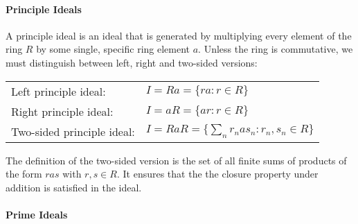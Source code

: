










\paragraph{Principle Ideals} A principle ideal is an ideal that is generated by multiplying every element of the ring $R$ by some single, specific ring element $a$. Unless the ring is commutative, we must distinguish between left, right and two-sided versions:

\medskip
\begin{tabular}{l l}
Left principle ideal:      & $I = R a = \{ r a : r \in R \}$ \\
Right principle ideal:     & $I = a R = \{ a r : r \in R \}$ \\
Two-sided principle ideal: & $I = RaR = \{ \sum_n r_n a s_n : r_n,s_n \in R \} $ \\
\end{tabular}
\medskip

The definition of the two-sided version is the set of all finite sums of products of the form $r a s$ with $r,s \in R$. It ensures that the the closure property under addition is satisfied in the ideal.%




\paragraph{Prime Ideals}


